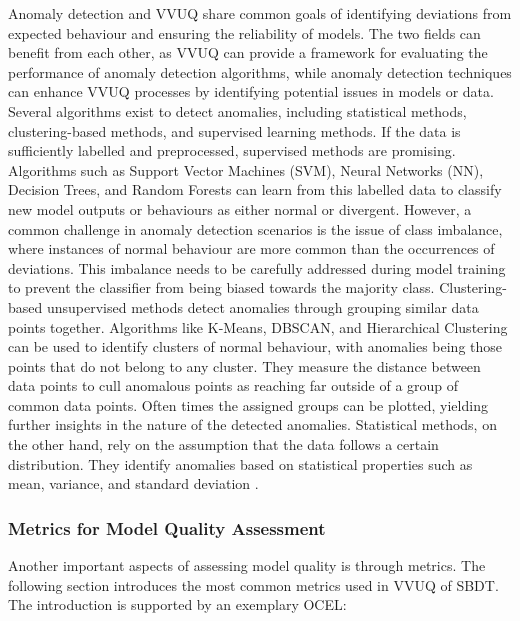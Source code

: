 Anomaly detection and VVUQ share common goals of identifying deviations from expected behaviour and ensuring the reliability of models. The two fields can benefit from each other, as VVUQ can provide a framework for evaluating the performance of anomaly detection algorithms, while anomaly detection techniques can enhance VVUQ processes by identifying potential issues in models or data.
Several algorithms exist to detect anomalies, including statistical methods, clustering-based methods, and supervised learning methods. If the data is sufficiently labelled and preprocessed, supervised methods are promising. Algorithms such as Support Vector Machines (SVM), Neural Networks (NN), Decision Trees, and Random Forests can learn from this labelled data to classify new model outputs or behaviours as either normal or divergent. However, a common challenge in anomaly detection scenarios is the issue of class imbalance, where instances of normal behaviour are more common than the occurrences of deviations. This imbalance needs to be carefully addressed during model training to prevent the classifier from being biased towards the majority class. Clustering-based unsupervised methods detect anomalies through grouping similar data points together. Algorithms like K-Means, DBSCAN, and Hierarchical Clustering can be used to identify clusters of normal behaviour, with anomalies being those points that do not belong to any cluster. They measure the distance between data points to cull anomalous points as reaching far outside of a group of common data points. Often times the assigned groups can be plotted, yielding further insights in the nature of the detected anomalies. Statistical methods, on the other hand, rely on the assumption that the data follows a certain distribution. They identify anomalies based on statistical properties such as mean, variance, and standard deviation \autocite{chandola2009anomaly}.

\subsubsection*{Metrics for Model Quality Assessment}
\label{sec:metrics-theory}
Another important aspects of assessing model quality is through metrics. The following section introduces the most common metrics used in VVUQ of SBDT. The introduction is supported by an exemplary OCEL:

